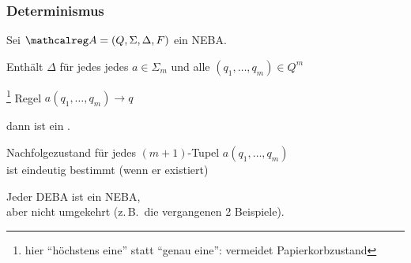     \begin{frame}
      \frametitle{Determinismus}

      \begin{Definition}
        Sei $\Aut{A} = (Q,\Sigma,\Delta,F)$ ein NEBA.
        \par\smallskip
        Enthält $\Delta$ für jedes jedes $a \in \Sigma_m$ und alle $(q_1,\dots,q_m) \in Q^m$
        \par
        \footnote[frame]{hier "`höchstens eine"' statt "`genau eine"': vermeidet Papierkorbzustand}
        Regel $a(q_1,\dots,q_m) \to q$
        \par\smallskip
        dann ist  ein .
      \end{Definition}

      \begin{Itemize}
        \item<2->[$\leadsto$]
          Nachfolgezustand für jedes $(m+1)$-Tupel $a(q_1,\dots,q_m)$ \\
          ist eindeutig bestimmt (wenn er existiert)
        \item<2->
          Jeder DEBA ist ein NEBA,\\
          aber nicht umgekehrt %
          {\small (z.\,B.\ die vergangenen 2 Beispiele)}.
      \end{Itemize}

    
    \end{frame}

